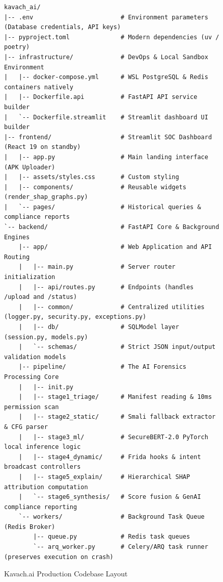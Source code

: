 \documentclass[10pt,a4paper]{article}
\begin{document}
\begin{figure}[H]
\centering
\begin{minipage}{0.95\linewidth}
\small
\begin{verbatim}
kavach_ai/
|-- .env                        # Environment parameters (Database credentials, API keys)
|-- pyproject.toml              # Modern dependencies (uv / poetry)
|-- infrastructure/             # DevOps & Local Sandbox Environment
|   |-- docker-compose.yml      # WSL PostgreSQL & Redis containers natively
|   |-- Dockerfile.api          # FastAPI API service builder
|   `-- Dockerfile.streamlit    # Streamlit dashboard UI builder
|-- frontend/                   # Streamlit SOC Dashboard (React 19 on standby)
|   |-- app.py                  # Main landing interface (APK Uploader)
|   |-- assets/styles.css       # Custom styling
|   |-- components/             # Reusable widgets (render_shap_graphs.py)
|   `-- pages/                  # Historical queries & compliance reports
`-- backend/                    # FastAPI Core & Background Engines
    |-- app/                    # Web Application and API Routing
    |   |-- main.py             # Server router initialization
    |   |-- api/routes.py       # Endpoints (handles /upload and /status)
    |   |-- common/             # Centralized utilities (logger.py, security.py, exceptions.py)
    |   |-- db/                 # SQLModel layer (session.py, models.py)
    |   `-- schemas/            # Strict JSON input/output validation models
    |-- pipeline/               # The AI Forensics Processing Core
    |   |-- init.py
    |   |-- stage1_triage/      # Manifest reading & 10ms permission scan
    |   |-- stage2_static/      # Smali fallback extractor & CFG parser
    |   |-- stage3_ml/          # SecureBERT-2.0 PyTorch local inference logic
    |   |-- stage4_dynamic/     # Frida hooks & intent broadcast controllers
    |   |-- stage5_explain/     # Hierarchical SHAP attribution computation
    |   `-- stage6_synthesis/   # Score fusion & GenAI compliance reporting
    `-- workers/                # Background Task Queue (Redis Broker)
        |-- queue.py            # Redis task queues
        `-- arq_worker.py       # Celery/ARQ task runner (preserves execution on crash)
\end{verbatim}
\end{minipage}
\caption{Kavach.ai Production Codebase Layout}
\label{fig:codebase_layout}
\end{figure}


\newpage
\end{document}
